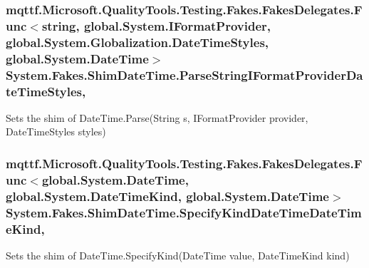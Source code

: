 \hypertarget{class_system_1_1_fakes_1_1_shim_date_time_a83196eae71d68ba14cbcb7bc4cbae61a}{
\subsubsection[{Parse\-String\-I\-Format\-Provider\-Date\-Time\-Styles}]{\setlength{\rightskip}{0pt plus 5cm}mqttf.\-Microsoft.\-Quality\-Tools.\-Testing.\-Fakes.\-Fakes\-Delegates.\-Func$<$string, global.\-System.\-I\-Format\-Provider, global.\-System.\-Globalization.\-Date\-Time\-Styles, global.\-System.\-Date\-Time$>$ System.\-Fakes.\-Shim\-Date\-Time.\-Parse\-String\-I\-Format\-Provider\-Date\-Time\-Styles\hspace{0.3cm}{\ttfamily [static]}, {\ttfamily [set]}}}\label{class_system_1_1_fakes_1_1_shim_date_time_a83196eae71d68ba14cbcb7bc4cbae61a}


Sets the shim of Date\-Time.\-Parse(\-String s, I\-Format\-Provider provider, Date\-Time\-Styles styles)

\hypertarget{class_system_1_1_fakes_1_1_shim_date_time_a29dee197913fb7a2d246d065f25e81dd}{
\subsubsection[{Specify\-Kind\-Date\-Time\-Date\-Time\-Kind}]{\setlength{\rightskip}{0pt plus 5cm}mqttf.\-Microsoft.\-Quality\-Tools.\-Testing.\-Fakes.\-Fakes\-Delegates.\-Func$<$global.\-System.\-Date\-Time, global.\-System.\-Date\-Time\-Kind, global.\-System.\-Date\-Time$>$ System.\-Fakes.\-Shim\-Date\-Time.\-Specify\-Kind\-Date\-Time\-Date\-Time\-Kind\hspace{0.3cm}{\ttfamily [static]}, {\ttfamily [set]}}}\label{class_system_1_1_fakes_1_1_shim_date_time_a29dee197913fb7a2d246d065f25e81dd}


Sets the shim of Date\-Time.\-Specify\-Kind(\-Date\-Time value, Date\-Time\-Kind kind)

